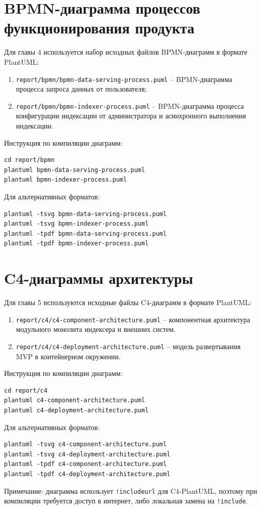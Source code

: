 ﻿\documentclass[14pt,a4paper]{extarticle}
\begin{document}
\section{BPMN-диаграмма процессов функционирования продукта}
\noindent Для главы 4 используется набор исходных файлов BPMN-диаграмм в формате PlantUML:
\begin{enumerate}
  \item \texttt{report/bpmn/bpmn-data-serving-process.puml} -- BPMN-диаграмма процесса запроса данных от пользователя;
  \item \texttt{report/bpmn/bpmn-indexer-process.puml} -- BPMN-диаграмма процесса конфигурации индексации от администратора и асинхронного выполнения индексации.
\end{enumerate}

\noindent Инструкция по компиляции диаграмм:
\begin{verbatim}
cd report/bpmn
plantuml bpmn-data-serving-process.puml
plantuml bpmn-indexer-process.puml
\end{verbatim}
\noindent Для альтернативных форматов:
\begin{verbatim}
plantuml -tsvg bpmn-data-serving-process.puml
plantuml -tsvg bpmn-indexer-process.puml
plantuml -tpdf bpmn-data-serving-process.puml
plantuml -tpdf bpmn-indexer-process.puml
\end{verbatim}

\newpage
\section{C4-диаграммы архитектуры}
\noindent Для главы 5 используются исходные файлы C4-диаграмм в формате PlantUML:
\begin{enumerate}
  \item \texttt{report/c4/c4-component-architecture.puml} -- компонентная архитектура модульного монолита индексера и внешних систем.
  \item \texttt{report/c4/c4-deployment-architecture.puml} -- модель развертывания MVP в контейнерном окружении.
\end{enumerate}

\noindent Инструкция по компиляции диаграмм:
\begin{verbatim}
cd report/c4
plantuml c4-component-architecture.puml
plantuml c4-deployment-architecture.puml
\end{verbatim}
\noindent Для альтернативных форматов:
\begin{verbatim}
plantuml -tsvg c4-component-architecture.puml
plantuml -tsvg c4-deployment-architecture.puml
plantuml -tpdf c4-component-architecture.puml
plantuml -tpdf c4-deployment-architecture.puml
\end{verbatim}
\noindent Примечание: диаграмма использует \texttt{!includeurl} для C4-PlantUML, поэтому при компиляции требуется доступ в интернет, либо локальная замена на \texttt{!include}.
\end{document}
